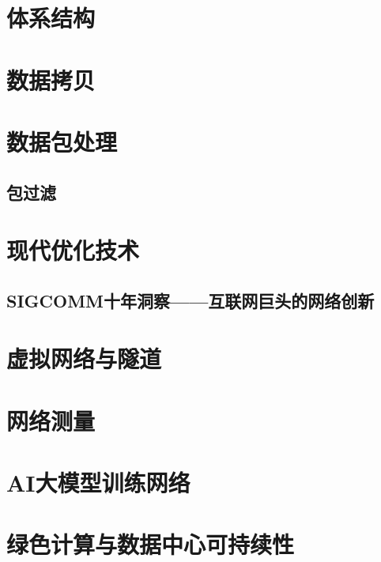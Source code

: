 \documentclass[12pt,a4paper]{book}
\begin{document}
\chapter{体系结构}



\chapter{数据拷贝}


\chapter{数据包处理}




\section{包过滤}


\chapter{现代优化技术}


\section{SIGCOMM十年洞察——互联网巨头的网络创新}


\chapter{虚拟网络与隧道}


\chapter{网络测量}


\chapter{AI大模型训练网络}


\chapter{绿色计算与数据中心可持续性}

\end{document}
